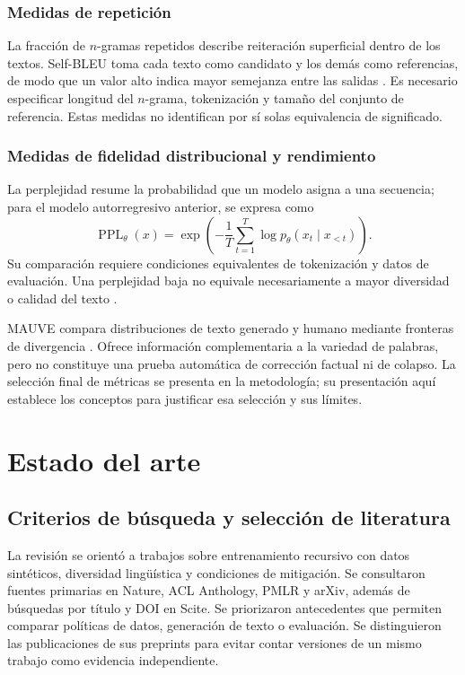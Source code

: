 \documentclass[12pt,letterpaper]{article}
\begin{document}
\subsubsection{Medidas de repetición}

La fracción de \(n\)-gramas repetidos describe reiteración superficial
dentro de los textos. Self-BLEU toma cada texto como candidato y los demás
como referencias, de modo que un valor alto indica mayor semejanza entre
las salidas \cite{zhu2018texygen}. Es necesario especificar longitud del
\(n\)-grama, tokenización y tamaño del conjunto de referencia. Estas
medidas no identifican por sí solas equivalencia de significado.

\subsubsection{Medidas de fidelidad distribucional y rendimiento}

La perplejidad resume la probabilidad que un modelo asigna a una secuencia;
para el modelo autorregresivo anterior, se expresa como
\begin{equation}
    \operatorname{PPL}_{\theta}(x)
    =\exp\left(-\frac{1}{T}\sum_{t=1}^{T}
    \log p_{\theta}(x_t\mid x_{<t})\right).
\end{equation}
Su comparación requiere condiciones equivalentes de tokenización y datos
de evaluación. Una perplejidad baja no equivale necesariamente a mayor
diversidad o calidad del texto \cite{guo2024}.

MAUVE compara distribuciones de texto generado y humano mediante fronteras
de divergencia \cite{pillutla2021}. Ofrece información complementaria a
la variedad de palabras, pero no constituye una prueba automática de
corrección factual ni de colapso. La selección final de métricas se
presenta en la metodología; su presentación aquí establece los conceptos
para justificar esa selección y sus límites.

\section{Estado del arte}

\subsection{Criterios de búsqueda y selección de literatura}

La revisión se orientó a trabajos sobre entrenamiento recursivo con datos
sintéticos, diversidad lingüística y condiciones de mitigación. Se
consultaron fuentes primarias en Nature, ACL Anthology, PMLR y arXiv,
además de búsquedas por título y DOI en Scite. Se priorizaron antecedentes
que permiten comparar políticas de datos, generación de texto o evaluación.
Se distinguieron las publicaciones de sus preprints para evitar contar
versiones de un mismo trabajo como evidencia independiente.
\end{document}
